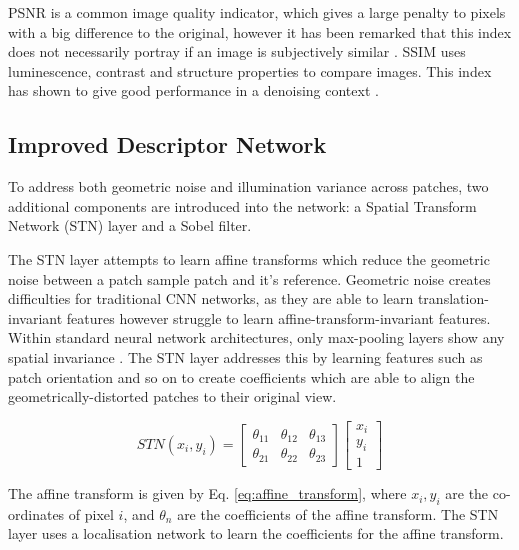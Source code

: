 \documentclass[10pt,twocolumn,letterpaper]{article}
\begin{document}


PSNR is a common image quality indicator, which gives a large penalty to pixels with a big difference to the original, however it has been remarked that this index does not necessarily portray if an image is subjectively similar \cite{6467150}. SSIM uses luminescence, contrast and structure properties to compare images. This index has shown to give good performance in a denoising context \cite{7797130}.

\subsection{Improved Descriptor Network}

To address both geometric noise and illumination variance across patches, two additional components are introduced into the network: a Spatial Transform Network (STN) layer and a Sobel filter. 

The STN layer \cite{jaderberg2015spatial} attempts to learn affine transforms which reduce the geometric noise between a patch sample patch and it's reference. Geometric noise creates difficulties for traditional CNN networks, as they are able to learn translation-invariant features however struggle to learn affine-transform-invariant features. Within standard neural network architectures, only max-pooling layers show any spatial invariance \cite{4270182}. The STN layer addresses this by learning features such as patch orientation and so on to create coefficients which are able to align the geometrically-distorted patches to their original view. 

\begin{equation}
    STN(x_i,y_i)
    = \begin{bmatrix}
    \theta_{11}  & \theta_{12} & \theta_{13} \\
    \theta_{21}  & \theta_{22} & \theta_{23} 
\end{bmatrix}
\begin{bmatrix}
    x_i \\
    y_i \\
    1
\end{bmatrix}
\label{eq:affine_transform}
\end{equation}

The affine transform is given by Eq. \ref{eq:affine_transform}, where $x_i,y_i$ are the co-ordinates of pixel $i$, and $\theta_n$ are the coefficients of the affine transform. The STN layer uses a localisation network to learn the coefficients for the affine transform. 
\end{document}
